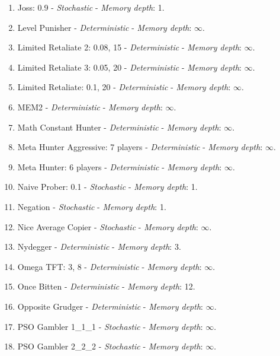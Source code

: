 \documentclass[10pt,letterpaper]{article}
\begin{document}
\begin{enumerate}
\item Joss: 0.9 - \textit{Stochastic} - \textit{Memory depth}: 1. \cite{Axelrod1980a, Stewart2012}
\item Level Punisher - \textit{Deterministic} - \textit{Memory depth}: \(\infty\). \cite{Eckhart2015}
\item Limited Retaliate 2: 0.08, 15 - \textit{Deterministic} - \textit{Memory depth}: \(\infty\). \cite{axelrodproject}
\item Limited Retaliate 3: 0.05, 20 - \textit{Deterministic} - \textit{Memory depth}: \(\infty\). \cite{axelrodproject}
\item Limited Retaliate: 0.1, 20 - \textit{Deterministic} - \textit{Memory depth}: \(\infty\). \cite{axelrodproject}
\item MEM2 - \textit{Deterministic} - \textit{Memory depth}: \(\infty\). \cite{Li2014}
\item Math Constant Hunter - \textit{Deterministic} - \textit{Memory depth}: \(\infty\). \cite{axelrodproject}
\item Meta Hunter Aggressive: 7 players - \textit{Deterministic} - \textit{Memory depth}: \(\infty\). \cite{axelrodproject}
\item Meta Hunter: 6 players - \textit{Deterministic} - \textit{Memory depth}: \(\infty\). \cite{axelrodproject}
\item Naive Prober: 0.1 - \textit{Stochastic} - \textit{Memory depth}: 1. \cite{Li2011}
\item Negation - \textit{Stochastic} - \textit{Memory depth}: 1. \cite{PD2017}
\item Nice Average Copier - \textit{Stochastic} - \textit{Memory depth}: \(\infty\). \cite{axelrodproject}
\item Nydegger - \textit{Deterministic} - \textit{Memory depth}: 3. \cite{Axelrod1980a}
\item Omega TFT: 3, 8 - \textit{Deterministic} - \textit{Memory depth}: \(\infty\). \cite{kendall2007iterated}
\item Once Bitten - \textit{Deterministic} - \textit{Memory depth}: 12. \cite{axelrodproject}
\item Opposite Grudger - \textit{Deterministic} - \textit{Memory depth}: \(\infty\). \cite{axelrodproject}
\item PSO Gambler 1\_1\_1 - \textit{Stochastic} - \textit{Memory depth}: \(\infty\). \cite{axelrodproject}
\item PSO Gambler 2\_2\_2 - \textit{Stochastic} - \textit{Memory depth}: \(\infty\). \cite{axelrodproject}

\end{enumerate}
\end{document}
